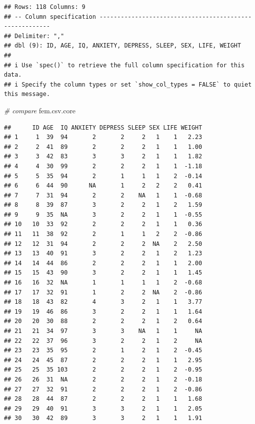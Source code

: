 \documentclass[
]{book}
\newenvironment{Shaded}{\begin{snugshade}}{\end{snugshade}}
\newcommand{\CommentTok}[1]{\textcolor[rgb]{0.56,0.35,0.01}{\textit{#1}}}
\newcommand{\NormalTok}[1]{#1}
\begin{document}
\begin{verbatim}
## Rows: 118 Columns: 9
## -- Column specification --------------------------------------------------------
## Delimiter: ","
## dbl (9): ID, AGE, IQ, ANXIETY, DEPRESS, SLEEP, SEX, LIFE, WEIGHT
## 
## i Use `spec()` to retrieve the full column specification for this data.
## i Specify the column types or set `show_col_types = FALSE` to quiet this message.
\end{verbatim}

\begin{Shaded}
\begin{Highlighting}[]
\CommentTok{\# compare}
\NormalTok{fem.csv.core}
\end{Highlighting}
\end{Shaded}

\begin{verbatim}
##      ID AGE  IQ ANXIETY DEPRESS SLEEP SEX LIFE WEIGHT
## 1     1  39  94       2       2     2   1    1   2.23
## 2     2  41  89       2       2     2   1    1   1.00
## 3     3  42  83       3       3     2   1    1   1.82
## 4     4  30  99       2       2     2   1    1  -1.18
## 5     5  35  94       2       1     1   1    2  -0.14
## 6     6  44  90      NA       1     2   2    2   0.41
## 7     7  31  94       2       2    NA   1    1  -0.68
## 8     8  39  87       3       2     2   1    2   1.59
## 9     9  35  NA       3       2     2   1    1  -0.55
## 10   10  33  92       2       2     2   1    1   0.36
## 11   11  38  92       2       1     1   2    2  -0.86
## 12   12  31  94       2       2     2  NA    2   2.50
## 13   13  40  91       3       2     2   1    2   1.23
## 14   14  44  86       2       2     2   1    1   2.00
## 15   15  43  90       3       2     2   1    1   1.45
## 16   16  32  NA       1       1     1   1    2  -0.68
## 17   17  32  91       1       2     2  NA    2  -0.86
## 18   18  43  82       4       3     2   1    1   3.77
## 19   19  46  86       3       2     2   1    1   1.64
## 20   20  30  88       2       2     2   1    2   0.64
## 21   21  34  97       3       3    NA   1    1     NA
## 22   22  37  96       3       2     2   1    2     NA
## 23   23  35  95       2       1     2   1    2  -0.45
## 24   24  45  87       2       2     2   1    1   2.95
## 25   25  35 103       2       2     2   1    2  -0.95
## 26   26  31  NA       2       2     2   1    2  -0.18
## 27   27  32  91       2       2     2   1    2  -0.86
## 28   28  44  87       2       2     2   1    1   1.68
## 29   29  40  91       3       3     2   1    1   2.05
## 30   30  42  89       3       3     2   1    1   1.91

\end{verbatim}
\end{document}
